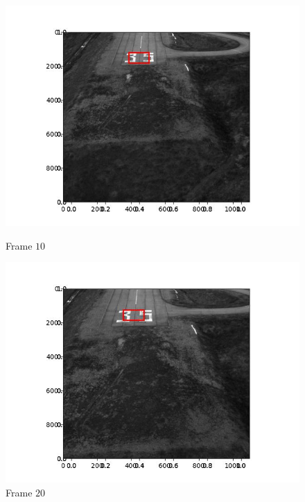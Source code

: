 \begin{figure}[H]
\begin{minipage}{.49\textwidth}
    \includegraphics[width=\textwidth]{./figures/lk/landing/frame000040.jpg}
    \caption{Frame $10$}
  \end{minipage}
  \hfill
  \begin{minipage}{.49\textwidth}
    \centering
    \includegraphics[width=\textwidth]{./figures/lk/landing/frame000049.jpg}
    \caption{Frame $20$}
  \end{minipage}
\end{figure}


